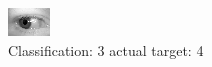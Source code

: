 \begin{figure}[h!]
\begin{center}
\includegraphics[width=0.60\columnwidth]{figures/ID684_class_3_target_4.png}
\end{center}
\caption{ Classification: 3 actual target: 4}
\label{fig:ID684_class_3_target_4}
\end{figure}
